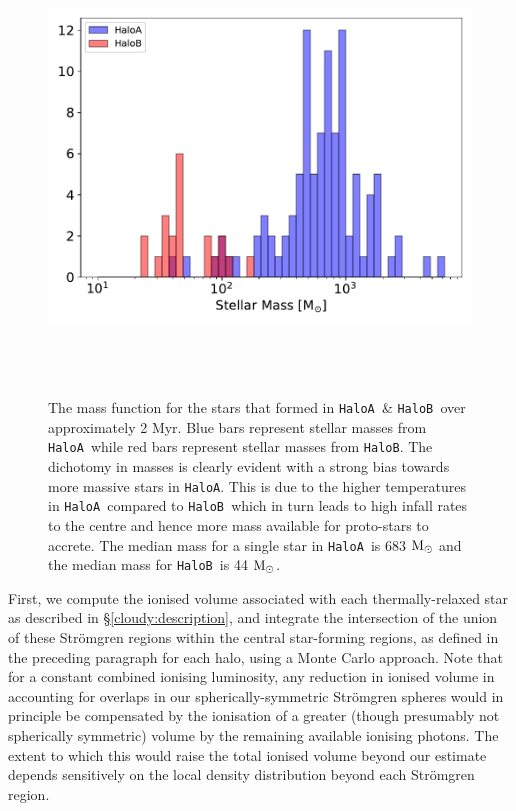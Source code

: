 \documentclass[twocolumn,iop,revtex4]{openjournal}
\newcommand{\msolar} {$\rm{M_{\odot}}~$}
\newcommand{\msolarc} {$\rm{M_{\odot}}$}
\newcommand{\ha} {\texttt{HaloA~}}
\newcommand{\hb} {\texttt{HaloB~}}
\newcommand{\hac} {\texttt{HaloA}}
\newcommand{\hbc} {\texttt{HaloB}}
\begin{document}
 
\begin{figure}
\centering
\begin{minipage}{175mm}      \begin{center}
\centerline{
    \includegraphics[width=18.0cm, height=12cm]{FIGURES/FinalMass_MultipleHaloes.pdf}}
\caption{
  The mass function for the stars that formed in \ha \& \hb over approximately 2 Myr.
  Blue bars represent stellar masses from \ha while red bars represent stellar masses from \hbc.
  The dichotomy in masses is clearly evident with a strong bias towards more massive stars
  in \hac. This is due to the higher temperatures in \ha compared to \hb which in turn
  leads to high infall rates to the centre and hence more mass available for proto-stars
  to accrete. The median mass for a single star in \ha is 683 \msolar and the median mass
  for \hb is 44 \msolarc. 
}
\label{Fig:MassFunction}
\end{center} \end{minipage}
\end{figure}

First, we compute the ionised volume associated with each thermally-relaxed star as
described in \S\ref{cloudy:description}, and integrate the intersection of the union of these
Str{\"o}mgren regions within the central star-forming regions, as defined in the preceding paragraph
for each halo, using a Monte Carlo approach. Note that for a constant combined ionising luminosity,
any reduction in ionised volume in accounting for overlaps in our spherically-symmetric
Str{\"o}mgren spheres would in principle be compensated by the ionisation of a greater
(though presumably not spherically symmetric) volume by the remaining available
ionising photons. The extent to which this would raise the total ionised volume beyond
our estimate depends sensitively on the local density distribution beyond each Str{\" o}mgren region.
\end{document}
